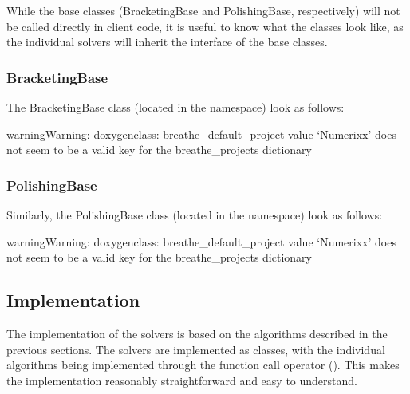 \documentclass[letterpaper,10pt,english]{sphinxmanual}
\begin{document}
\sphinxAtStartPar
While the base classes (BracketingBase and PolishingBase, respectively) will not be called directly in client code, it is useful to know what the classes look like, as the individual solvers will inherit the interface of the base classes.


\subsubsection{BracketingBase}
\label{\detokenize{docRoots:bracketingbase}}
\sphinxAtStartPar
The BracketingBase class (located in the  namespace) look as follows:

\begin{sphinxadmonition}{warning}{Warning:}
\sphinxAtStartPar
doxygenclass: breathe\_default\_project value ‘Numerixx’ does not seem to be a valid key for the breathe\_projects dictionary
\end{sphinxadmonition}


\subsubsection{PolishingBase}
\label{\detokenize{docRoots:polishingbase}}
\sphinxAtStartPar
Similarly, the PolishingBase class (located in the  namespace) look as follows:

\begin{sphinxadmonition}{warning}{Warning:}
\sphinxAtStartPar
doxygenclass: breathe\_default\_project value ‘Numerixx’ does not seem to be a valid key for the breathe\_projects dictionary
\end{sphinxadmonition}


\subsection{Implementation}
\label{\detokenize{docRoots:implementation}}
\sphinxAtStartPar
The implementation of the solvers is based on the algorithms described in the previous sections. The solvers are implemented as classes, with the individual algorithms being implemented through the function call operator (). This makes the implementation reasonably straightforward and easy to understand.

\sphinxAtStartPar
{}



\renewcommand{\indexname}{Index}
\printindex
\end{document}
